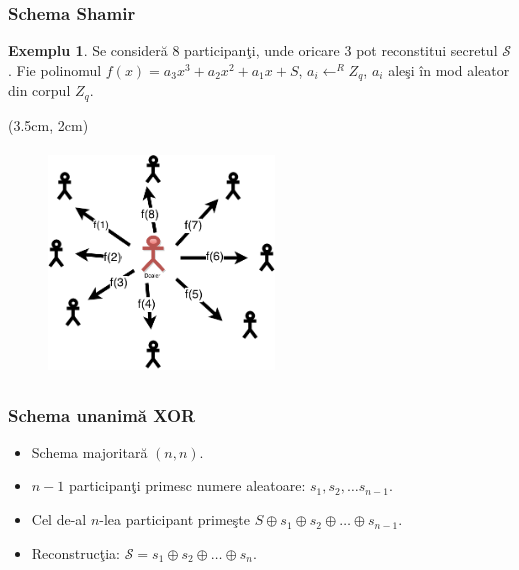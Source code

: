 \documentclass{beamer}
\theoremstyle{definition}
\newtheorem{my_example}[theorem]{Exemplu}
\begin{document}
\begin{frame}
    \frametitle{Schema Shamir}
     {
        \begin{my_example}
           Se consider\u{a} 8 participan\c{t}i, unde oricare $3$ pot reconstitui secretul $\mathcal{S}$.
           Fie polinomul $f(x) = a_3x ^ 3 + a_2x ^ 2 + a_1x + S$, $a_i \leftarrow^R Z_q$, $a_i$ ale\c{s}i \^{i}n mod aleator din corpul $Z_q$.
        \end{my_example}
    }
     {
     \begin{textblock*}{4cm}(3.5cm, 2cm)
        \begin{figure}
            \includegraphics[width=6cm,height=6cm,keepaspectratio]{img/shamir/shamir-split.png}
       \end{figure}
        \end{textblock*}
 
    }
\end{frame}

\begin{frame}
    \frametitle{Schema unanim\u{a} XOR}
    \begin{itemize}
        \item Schema majoritar\u{a} $(n,n)$.
        \pause
        \item $n-1$ participan\c{t}i primesc numere aleatoare: $s_1, s_2, \dots s_{n-1}$.
        \pause
        \item Cel de-al $n$-lea participant prime\c{s}te $S \oplus s_1 \oplus s_2 \oplus \dots \oplus s_{n-1}$.
        \pause
        \item Reconstruc\c{t}ia: $\mathcal{S} = s_1 \oplus s_2 \oplus \dots \oplus s_n$.
    \end{itemize}
\end{frame}
\end{document}
